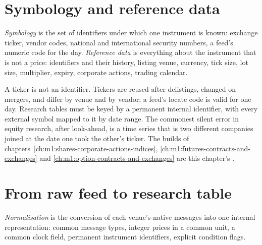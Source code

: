 \section{Symbology and reference data}

\begin{definition}\label{def:m1:reading-market-data:refdata}
\emph{Symbology} is the set of identifiers under which one
instrument is known: exchange ticker, vendor codes, national and
international security numbers, a feed's numeric code for the day.
\emph{Reference data} is everything about the
instrument that is not a price: identifiers and their history, listing venue,
currency, tick size, lot size, multiplier, expiry, corporate actions,
trading calendar.
\end{definition}

A ticker is not an identifier. Tickers are reused after delistings, changed
on mergers, and differ by venue and by vendor; a feed's locate code is valid
for one day. Research tables must be keyed by a permanent internal
identifier, with every external symbol mapped to it by date range. The
commonest silent error in equity research, after look-ahead, is a
time series that is two different companies joined at the date one took the
other's ticker. The builds of chapters~\ref{ch:m1:shares-corporate-actions-indices},
\ref{ch:m1:futures-contracts-and-exchanges} and
\ref{ch:m1:option-contracts-and-exchanges} are this chapter's .

\section{From raw feed to research table}

\begin{definition}[Normalisation]\label{def:m1:reading-market-data:norm}
\emph{Normalisation} is the conversion of each venue's
native messages into one internal representation: common message types,
integer prices in a common unit, a common clock field, permanent instrument
identifiers, explicit condition flags.
\end{definition}

